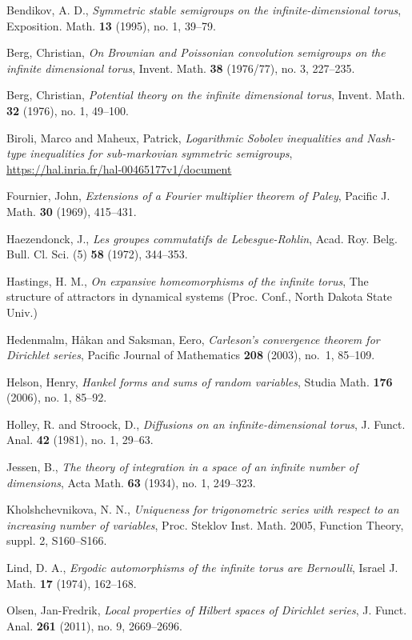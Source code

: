 \documentclass{article}
\begin{document}
Bendikov, A. D., {\em Symmetric stable semigroups on the infinite-dimensional torus},
Exposition. Math. \textbf{13} (1995), no. 1, 39--79. 

Berg, Christian, {\em On Brownian and Poissonian convolution semigroups on the infinite dimensional torus},
Invent. Math. \textbf{38} (1976/77), no. 3, 227--235.

Berg, Christian, {\em Potential theory on the infinite dimensional torus}, Invent. Math. \textbf{32} (1976), no. 1, 49--100. 

Biroli, Marco and Maheux, Patrick, {\em Logarithmic Sobolev inequalities and Nash-type inequalities for sub-markovian symmetric semigroups},
\url{https://hal.inria.fr/hal-00465177v1/document}

Fournier, John, {\em Extensions of a Fourier multiplier theorem of Paley}, Pacific J. Math. \textbf{30} (1969), 415--431. 

Haezendonck, J., 
{\em Les groupes commutatifs de Lebesgue-Rohlin},
Acad. Roy. Belg. Bull. Cl. Sci. (5) \textbf{58} (1972), 344--353. 

Hastings, H. M., {\em On expansive homeomorphisms of the infinite torus}, The structure of
attractors in dynamical systems (Proc. Conf., North Dakota State Univ.)

Hedenmalm, H{\aa}kan and Saksman, Eero, {\em Carleson's convergence theorem for Dirichlet series},
Pacific Journal of Mathematics \textbf{208} (2003), no.~1, 85--109.

Helson, Henry, {\em Hankel forms and sums of random variables},  Studia Math. \textbf{176} (2006), no. 1, 85--92. 

Holley, R. and Stroock, D., {\em Diffusions on an infinite-dimensional torus}, J. Funct. Anal. \textbf{42} (1981), no. 1, 29--63. 

Jessen, B., {\em The theory of integration in a space of an infinite number of dimensions}, Acta Math. \textbf{63} (1934), no. 1,
249--323.

Kholshchevnikova, N. N., {\em Uniqueness for trigonometric series with respect to an increasing number of variables},
Proc. Steklov Inst. Math. 2005, Function Theory, suppl. 2, S160--S166. 

Lind, D. A., {\em Ergodic automorphisms of the infinite torus are Bernoulli},
Israel J. Math. \textbf{17} (1974), 162--168. 

Olsen, Jan-Fredrik, {\em Local properties of Hilbert spaces of Dirichlet series},
J. Funct. Anal. \textbf{261} (2011), no. 9, 2669--2696. 
\end{document}
